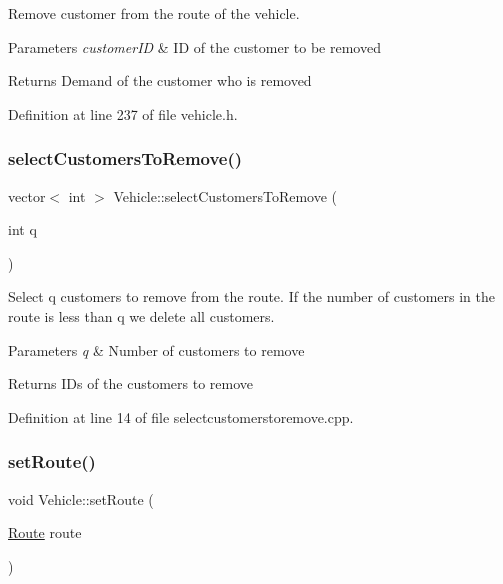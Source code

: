 Remove customer from the route of the vehicle. 
\begin{DoxyParams}{Parameters}
{\em customer\+ID} & ID of the customer to be removed \\
\hline
\end{DoxyParams}
\begin{DoxyReturn}{Returns}
Demand of the customer who is removed 
\end{DoxyReturn}


Definition at line 237 of file vehicle.\+h.

\mbox{\label{class_vehicle_aed568174291108fd205254033927bbfd}} 
\subsubsection{\texorpdfstring{select\+Customers\+To\+Remove()}{selectCustomersToRemove()}}
{\footnotesize\ttfamily vector$<$ int $>$ Vehicle\+::select\+Customers\+To\+Remove (\begin{DoxyParamCaption}\item[{int}]{q }\end{DoxyParamCaption})}

Select q customers to remove from the route. If the number of customers in the route is less than q we delete all customers. 
\begin{DoxyParams}{Parameters}
{\em q} & Number of customers to remove \\
\hline
\end{DoxyParams}
\begin{DoxyReturn}{Returns}
I\+Ds of the customers to remove 
\end{DoxyReturn}


Definition at line 14 of file selectcustomerstoremove.\+cpp.

\mbox{\label{class_vehicle_adc355690a822465f0ef1f715a2e4d7f4}} 
\subsubsection{\texorpdfstring{set\+Route()}{setRoute()}}
{\footnotesize\ttfamily void Vehicle\+::set\+Route (\begin{DoxyParamCaption}\item[{\hyperlink{class_route}{Route}}]{route }\end{DoxyParamCaption})}

